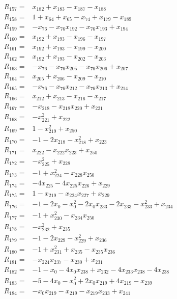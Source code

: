 \begin{align*}
R_{157}={}&x_{182}+x_{183}-x_{187}-x_{188}\\[3pt]
R_{158}={}&1+x_{64}+x_{65}-x_{74}+x_{179}-x_{189}\\[3pt]
R_{159}={}&-x_{76}-x_{76}x_{192}-x_{76}x_{193}+x_{194}\\[3pt]
R_{160}={}&x_{192}+x_{193}-x_{196}-x_{197}\\[3pt]
R_{161}={}&x_{192}+x_{193}-x_{199}-x_{200}\\[3pt]
R_{162}={}&x_{192}+x_{193}-x_{202}-x_{203}\\[3pt]
R_{163}={}&-x_{76}-x_{76}x_{205}-x_{76}x_{206}+x_{207}\\[3pt]
R_{164}={}&x_{205}+x_{206}-x_{209}-x_{210}\\[3pt]
R_{165}={}&-x_{76}-x_{76}x_{212}-x_{76}x_{213}+x_{214}\\[3pt]
R_{166}={}&x_{212}+x_{213}-x_{216}-x_{217}\\[3pt]
R_{167}={}&-x_{218}-x_{218}x_{220}+x_{221}\\[3pt]
R_{168}={}&-x_{221}^{2}+x_{222}\\[3pt]
R_{169}={}&1-x_{219}^{2}+x_{250}\\[3pt]
R_{170}={}&-1-2x_{218}-x_{218}^{2}+x_{223}\\[3pt]
R_{171}={}&x_{222}-x_{222}x_{223}+x_{250}\\[3pt]
R_{172}={}&-x_{225}^{2}+x_{228}\\[3pt]
R_{173}={}&-1+x_{224}^{2}-x_{228}x_{250}\\[3pt]
R_{174}={}&-4x_{225}-4x_{225}x_{226}+x_{229}\\[3pt]
R_{175}={}&1-x_{219}-x_{224}x_{227}+x_{229}\\[3pt]
R_{176}={}&-1-2x_{0}-x_{0}^{2}-2x_{0}x_{233}-2x_{233}-x_{233}^{2}+x_{234}\\[3pt]
R_{177}={}&-1+x_{230}^{2}-x_{234}x_{250}\\[3pt]
R_{178}={}&-x_{232}^{2}+x_{235}\\[3pt]
R_{179}={}&-1-2x_{229}-x_{229}^{2}+x_{236}\\[3pt]
R_{180}={}&-1+x_{231}^{2}+x_{235}-x_{235}x_{236}\\[3pt]
R_{181}={}&-x_{224}x_{237}-x_{230}+x_{231}\\[3pt]
R_{182}={}&-1-x_{0}-4x_{0}x_{238}+x_{232}-4x_{233}x_{238}-4x_{238}\\[3pt]
R_{183}={}&-5-4x_{0}-x_{0}^{2}+2x_{0}x_{219}+4x_{219}-x_{239}\\[3pt]
R_{184}={}&-x_{0}x_{219}-x_{219}-x_{219}x_{233}+x_{241}\\[3pt]

\end{align*}
